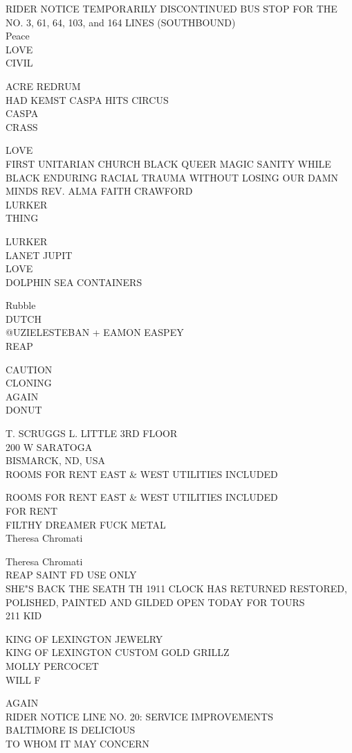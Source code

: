 \documentclass[10pt,letterpaper]{article}
\begin{document}
RIDER NOTICE TEMPORARILY DISCONTINUED BUS STOP FOR THE NO. 3, 61, 64, 103, and 164 LINES (SOUTHBOUND)\\
Peace\\
LOVE\\
CIVIL

ACRE REDRUM\\
HAD KEMST CASPA HITS CIRCUS\\
CASPA\\
CRASS

LOVE\\
FIRST UNITARIAN CHURCH BLACK QUEER MAGIC SANITY WHILE BLACK ENDURING RACIAL TRAUMA WITHOUT LOSING OUR DAMN MINDS REV. ALMA FAITH CRAWFORD\\
LURKER\\
THING

LURKER\\
LANET JUPIT\\
LOVE\\
DOLPHIN SEA CONTAINERS

Rubble\\
DUTCH\\
@UZIELESTEBAN + EAMON EASPEY\\
REAP

CAUTION\\
CLONING\\
AGAIN\\
DONUT

T. SCRUGGS L. LITTLE 3RD FLOOR\\
200 W SARATOGA\\
BISMARCK, ND, USA\\
ROOMS FOR RENT EAST \& WEST UTILITIES INCLUDED

ROOMS FOR RENT EAST \& WEST UTILITIES INCLUDED\\
FOR RENT\\
FILTHY DREAMER FUCK METAL\\
Theresa Chromati

Theresa Chromati\\
REAP SAINT FD USE ONLY\\
SHE"S BACK THE SEATH TH 1911 CLOCK HAS RETURNED RESTORED, POLISHED, PAINTED AND GILDED OPEN TODAY FOR TOURS\\
211 KID

KING OF LEXINGTON JEWELRY\\
KING OF LEXINGTON CUSTOM GOLD GRILLZ\\
MOLLY PERCOCET\\
WILL F

AGAIN\\
RIDER NOTICE LINE NO. 20: SERVICE IMPROVEMENTS\\
BALTIMORE IS DELICIOUS\\
TO WHOM IT MAY CONCERN
\end{document}
